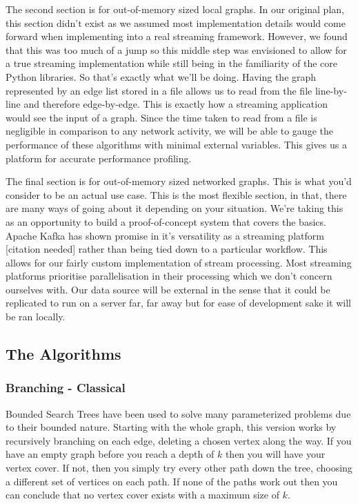 The second section is for out-of-memory sized local graphs. In our original
plan, this section didn't exist as we assumed most implementation details would
come forward when implementing into a real streaming framework. However, we
found that this was too much of a jump so this middle step was envisioned to
allow for a true streaming implementation while still being in the familiarity
of the core Python libraries. So that's exactly what we'll be doing. Having the
graph represented by an edge list stored in a file allows us to read from the
file line-by-line and therefore edge-by-edge. This is exactly how a streaming
application would see the input of a graph. Since the time taken to read from a
file is negligible in comparison to any network activity, we will be able to
gauge the performance of these algorithms with minimal external variables. This
gives us a platform for accurate performance profiling.

The final section is for out-of-memory sized networked graphs. This is what
you'd consider to be an actual use case. This is the most flexible section, in
that, there are many ways of going about it depending on your situation. We're
taking this as an opportunity to build a proof-of-concept system that covers
the basics. Apache Kafka has shown promise in it's versatility as a streaming
platform [citation needed] rather than being tied down to a particular
workflow. This allows for our fairly custom implementation of stream
processing. Most streaming platforms prioritise parallelisation in their
processing which we don't concern ourselves with. Our data source will be
external in the sense that it could be replicated to run on a server far, far
away but for ease of development sake it will be ran locally.

\subsection{The Algorithms}

\subsubsection{Branching - Classical}

Bounded Search Trees have been used to solve many parameterized problems due to
their bounded nature. Starting with the whole graph, this version works by
recursively branching on each edge, deleting a chosen vertex along the way. If
you have an empty graph before you reach a depth of \(k\) then you will have
your vertex cover. If not, then you simply try every other path down the tree,
choosing a different set of vertices on each path. If none of the paths work
out then you can conclude that no vertex cover exists with a maximum size of
\(k\).

